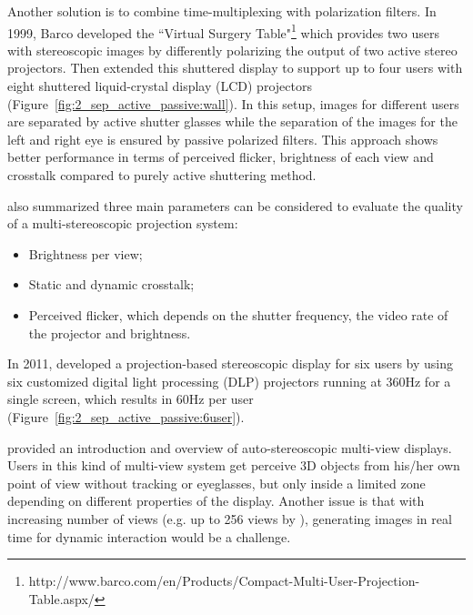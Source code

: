 Another solution is to combine time-multiplexing with polarization filters. In 1999, Barco developed the ``Virtual Surgery Table"\footnote{http://www.barco.com/en/Products/Compact-Multi-User-Projection-Table.aspx/} which provides two users with stereoscopic images by differently polarizing the output of two active stereo projectors. Then \citet{Frohlich2005MultiViewer} extended this shuttered display to support up to four users with eight shuttered liquid-crystal display (LCD) projectors (Figure~\ref{fig:2_sep_active_passive:wall}). In this setup, images for different users are separated by active shutter glasses while the separation of the images for the left and right eye is ensured by passive polarized filters. This approach shows better performance in terms of perceived flicker, brightness of each view and crosstalk compared to purely active shuttering method.


\citet{Frohlich2005MultiViewer} also summarized three main parameters can be considered to evaluate the quality of a multi-stereoscopic projection system:

\begin{itemize}
\item Brightness per view;
\item Static and dynamic crosstalk; 
\item Perceived flicker, which depends on the shutter frequency, the video rate of the projector and brightness.
\end{itemize}

In 2011, \citet{Kulik2011CSS} developed a projection-based stereoscopic display for six users by using six customized digital light processing (DLP) projectors running at 360Hz for a single screen, which results in 60Hz per user (Figure~\ref{fig:2_sep_active_passive:6user}).


\citet{Dodgson2005Autostereoscopic} provided an introduction and overview of auto-stereoscopic multi-view displays. Users in this kind of multi-view system get perceive 3D objects from his/her own point of view without tracking or eyeglasses, but only inside a limited zone depending on different properties of the display. Another issue is that with increasing number of views (e.g. up to 256 views by \citet{Takaki2010Multi}), generating images in real time for dynamic interaction would be a challenge.

